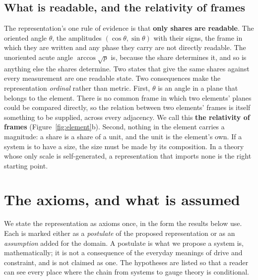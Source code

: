 \documentclass[11pt,a4paper]{article}
\theoremstyle{plain}
\theoremstyle{definition}
\theoremstyle{remark}
\begin{document}
\subsection{What is readable, and the relativity of frames}

The representation's one rule of evidence is that \textbf{only shares are readable}. The oriented angle $\theta$, the amplitudes $(\cos\theta,\sin\theta)$ with their signs, the frame in which they are written and any phase they carry are not directly readable. The unoriented acute angle $\arccos\sqrt p$ is, because the share determines it, and so is anything else the shares determine. Two states that give the same shares against every measurement are one readable state. Two consequences make the representation \emph{ordinal} rather than metric. First, $\theta$ is an angle in a plane that belongs to the element. There is no common frame in which two elements' planes could be compared directly, so the relation between two elements' frames is itself something to be supplied, across every adjacency. We call this \textbf{the relativity of frames} (Figure~\ref{fig:element}b). Second, nothing in the element carries a magnitude: a share is a share of a unit, and the unit is the element's own. If a system is to have a size, the size must be made by its composition. In a theory whose only scale is self-generated, a representation that imports none is the right starting point.

\clearpage
\section{The axioms, and what is assumed}\label{sec:axioms}

We state the representation as axioms once, in the form the results below use. Each is marked either as a \emph{postulate} of the proposed representation or as an \emph{assumption} added for the domain. A postulate is what we propose a system is, mathematically; it is not a consequence of the everyday meanings of drive and constraint, and is not claimed as one. The hypotheses are listed so that a reader can see every place where the chain from systems to gauge theory is conditional.
\end{document}
